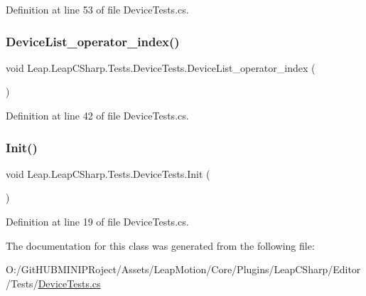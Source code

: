 Definition at line 53 of file Device\+Tests.\+cs.

\mbox{\label{class_leap_1_1_leap_c_sharp_1_1_tests_1_1_device_tests_a9dc5ad55e1adbd17abdbc27dce3786d8}} 
\subsubsection{\texorpdfstring{DeviceList\_operator\_index()}{DeviceList\_operator\_index()}}
{\footnotesize\ttfamily void Leap.\+Leap\+C\+Sharp.\+Tests.\+Device\+Tests.\+Device\+List\+\_\+operator\+\_\+index (\begin{DoxyParamCaption}{ }\end{DoxyParamCaption})}



Definition at line 42 of file Device\+Tests.\+cs.

\mbox{\label{class_leap_1_1_leap_c_sharp_1_1_tests_1_1_device_tests_aee6d06d56c20ca05626ebc04fb5985a1}} 
\subsubsection{\texorpdfstring{Init()}{Init()}}
{\footnotesize\ttfamily void Leap.\+Leap\+C\+Sharp.\+Tests.\+Device\+Tests.\+Init (\begin{DoxyParamCaption}{ }\end{DoxyParamCaption})}



Definition at line 19 of file Device\+Tests.\+cs.



The documentation for this class was generated from the following file\+:\begin{DoxyCompactItemize}
\item 
O\+:/\+Git\+H\+U\+B\+M\+I\+N\+I\+P\+Roject/\+Assets/\+Leap\+Motion/\+Core/\+Plugins/\+Leap\+C\+Sharp/\+Editor/\+Tests/\mbox{\hyperlink{_device_tests_8cs}{Device\+Tests.\+cs}}\end{DoxyCompactItemize}
